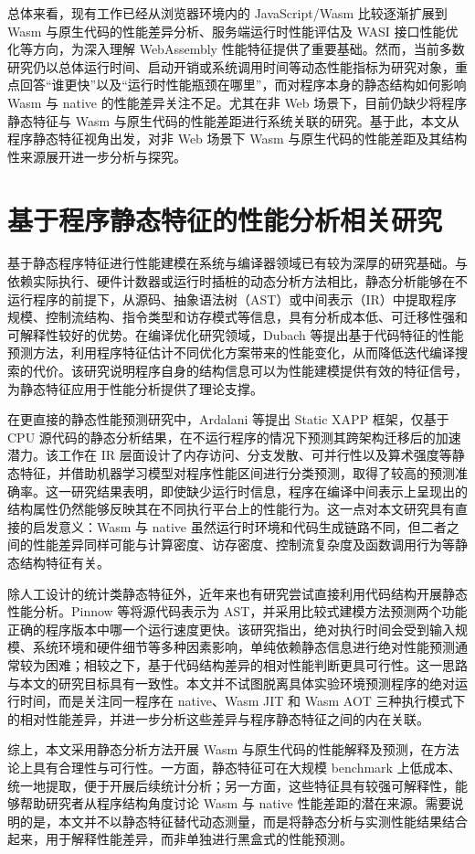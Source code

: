 总体来看，现有工作已经从浏览器环境内的 JavaScript/Wasm 比较逐渐扩展到 Wasm 与原生代码的性能差异分析、服务端运行时性能评估及 WASI 接口性能优化等方向，为深入理解 WebAssembly 性能特征提供了重要基础。然而，当前多数研究仍以总体运行时间、启动开销或系统调用时间等动态性能指标为研究对象，重点回答“谁更快”以及“运行时性能瓶颈在哪里”，而对程序本身的静态结构如何影响 Wasm 与 native 的性能差异关注不足。尤其在非 Web 场景下，目前仍缺少将程序静态特征与 Wasm 与原生代码的性能差距进行系统关联的研究。基于此，本文从程序静态特征视角出发，对非 Web 场景下 Wasm 与原生代码的性能差距及其结构性来源展开进一步分析与探究。


\section{基于程序静态特征的性能分析相关研究}


基于静态程序特征进行性能建模在系统与编译器领域已有较为深厚的研究基础。与依赖实际执行、硬件计数器或运行时插桩的动态分析方法相比，静态分析能够在不运行程序的前提下，从源码、抽象语法树（AST）或中间表示（IR）中提取程序规模、控制流结构、指令类型和访存模式等信息，具有分析成本低、可迁移性强和可解释性较好的优势。在编译优化研究领域，Dubach 等提出基于代码特征的性能预测方法，利用程序特征估计不同优化方案带来的性能变化，从而降低迭代编译搜索的代价\cite{dubach2007fast}。该研究说明程序自身的结构信息可以为性能建模提供有效的特征信号，为静态特征应用于性能分析提供了理论支撑。

在更直接的静态性能预测研究中，Ardalani 等提出 Static XAPP 框架，仅基于 CPU 源代码的静态分析结果，在不运行程序的情况下预测其跨架构迁移后的加速潜力\cite{ardalani2019static}。该工作在 IR 层面设计了内存访问、分支发散、可并行性以及算术强度等静态特征，并借助机器学习模型对程序性能区间进行分类预测，取得了较高的预测准确率。这一研究结果表明，即使缺少运行时信息，程序在编译中间表示上呈现出的结构属性仍然能够反映其在不同执行平台上的性能行为。这一点对本文研究具有直接的启发意义：Wasm 与 native 虽然运行时环境和代码生成链路不同，但二者之间的性能差异同样可能与计算密度、访存密度、控制流复杂度及函数调用行为等静态结构特征有关。

除人工设计的统计类静态特征外，近年来也有研究尝试直接利用代码结构开展静态性能分析。Pinnow 等将源代码表示为 AST，并采用比较式建模方法预测两个功能正确的程序版本中哪一个运行速度更快\cite{pinnow2021comparative}。该研究指出，绝对执行时间会受到输入规模、系统环境和硬件细节等多种因素影响，单纯依赖静态信息进行绝对性能预测通常较为困难；相较之下，基于代码结构差异的相对性能判断更具可行性。这一思路与本文的研究目标具有一致性。本文并不试图脱离具体实验环境预测程序的绝对运行时间，而是关注同一程序在 native、Wasm JIT 和 Wasm AOT 三种执行模式下的相对性能差异，并进一步分析这些差异与程序静态特征之间的内在关联。

综上，本文采用静态分析方法开展 Wasm 与原生代码的性能解释及预测，在方法论上具有合理性与可行性。一方面，静态特征可在大规模 benchmark 上低成本、统一地提取，便于开展后续统计分析；另一方面，这些特征具有较强可解释性，能够帮助研究者从程序结构角度讨论 Wasm 与 native 性能差距的潜在来源。需要说明的是，本文并不以静态特征替代动态测量，而是将静态分析与实测性能结果结合起来，用于解释性能差异，而非单独进行黑盒式的性能预测。

